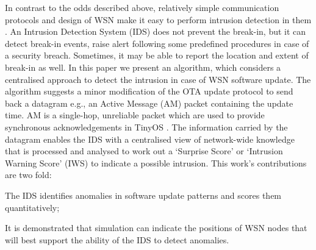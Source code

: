\documentclass[conference,final]{IEEEtran}
\newcommand{\notedme}[1]{\raisebox{0pt}[0pt][0pt]{\pdfcomment[open=true,color=blue]{#1}}}
\begin{document}
In contrast to the odds described above, relatively simple communication protocols and design of WSN make it easy to perform intrusion detection in them \cite{quing09}.
An Intrusion Detection System (IDS) does not prevent the break-in, but it can detect  break-in events, raise alert following some predefined procedures in case of a security breach.
Sometimes, it may be able to report the location and extent of break-in as well.
In this paper we present an algorithm, which considers a centralised approach to detect  the intrusion in case of WSN software update.
The algorithm suggests a minor modification of the OTA update protocol to send back a datagram e.g., an Active Message (AM) packet containing the update time.
AM is a single-hop, unreliable packet which are used to provide synchronous acknowledgements in TinyOS \cite{tep116}. %
The information carried by the datagram enables the IDS with a centralised view of network-wide knowledge that is processed and analysed to work out a  `Surprise Score' or `Intrusion Warning Score' (IWS) to indicate a possible intrusion.
This work's contributions are two fold: 
\begin{inparaenum}
\item  The IDS identifies anomalies in software update patterns and scores them quantitatively;
\item It is demonstrated that simulation can indicate the positions of WSN nodes that will best support the ability of the IDS to detect anomalies.
\end{inparaenum}
\end{document}
